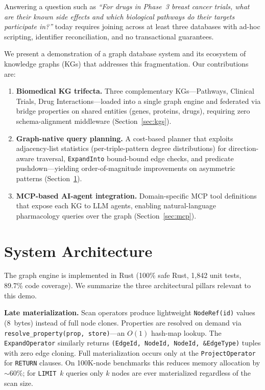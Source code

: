 \documentclass[sigconf, anonymous, review]{acmart}
\begin{document}
Answering a question such as \emph{``For drugs in Phase~3 breast cancer
trials, what are their known side effects and which biological pathways
do their targets participate in?''} today requires joining across at
least three databases with ad-hoc scripting, identifier reconciliation,
and no transactional guarantees.

We present a demonstration of a graph database system and its ecosystem
of knowledge graphs (KGs) that addresses this fragmentation.  Our
contributions are:

\begin{enumerate}
\item \textbf{Biomedical KG trifecta.}  Three complementary KGs---Pathways,
Clinical Trials, Drug Interactions---loaded into a single graph
engine and federated via bridge properties on shared entities
(genes, proteins, drugs), requiring zero schema-alignment middleware
(Section~\ref{sec:kgs}).

\item \textbf{Graph-native query planning.}  A cost-based planner that
exploits adjacency-list statistics (per-triple-pattern degree
distributions) for direction-aware traversal, \texttt{ExpandInto}
bound-bound edge checks, and predicate pushdown---yielding
order-of-magnitude improvements on asymmetric patterns
(Section~\ref{sec:engine}).

\item \textbf{MCP-based AI-agent integration.}  Domain-specific MCP
tool definitions that expose each KG to LLM agents, enabling
natural-language pharmacology queries over the graph
(Section~\ref{sec:mcp}).
\end{enumerate}

\section{System Architecture}\label{sec:engine}

The graph engine is implemented in Rust (100\% safe Rust, 1,842 unit
tests, 89.7\% code coverage).  We summarize the three architectural
pillars relevant to this demo.

\smallskip\noindent\textbf{Late materialization.}
Scan operators produce lightweight \texttt{NodeRef(id)} values (8~bytes)
instead of full node clones.  Properties are resolved on demand via
\texttt{resolve\_property(prop, store)}---an $O(1)$ hash-map lookup.
The \texttt{ExpandOperator} similarly returns
\texttt{(EdgeId, NodeId, NodeId, \&EdgeType)} tuples with zero edge
cloning.  Full materialization occurs only at the \texttt{ProjectOperator}
for \texttt{RETURN} clauses.  On 100K-node benchmarks this reduces memory
allocation by ${\sim}60\%$; for \texttt{LIMIT}~$k$ queries only $k$ nodes
are ever materialized regardless of the scan size.
\end{document}
